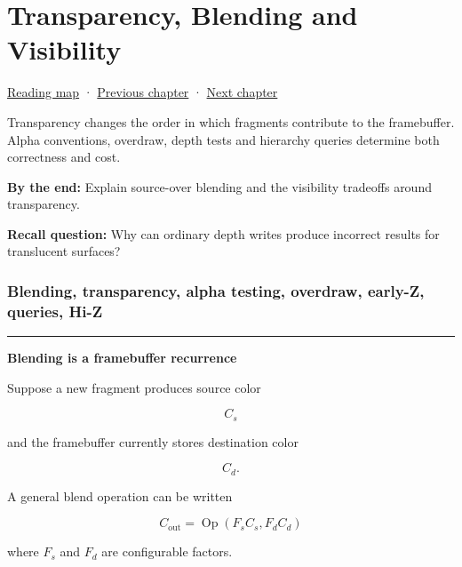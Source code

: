 \chapter{Transparency, Blending and Visibility}\label{03-visual-computing-i-ch014-transparency-blending-and-visibility}\hypertarget{03-visual-computing-i-ch014}{}\label{stagechapter:03-visual-computing-i-ch014}

\hypertarget{03-visual-computing-i-ch014-transparency-blending-and-visibility}{}

\hyperref[volume-reading-map]{Reading map} · \hyperref[03-visual-computing-i-ch010]{Previous chapter} · \hyperref[03-visual-computing-i-ch015-rasterization-foundations-and-renderer-evidence]{Next chapter}

Transparency changes the order in which fragments contribute to the framebuffer. Alpha conventions, overdraw, depth tests and hierarchy queries determine both correctness and cost.

\textbf{By the end:} Explain source-over blending and the visibility tradeoffs around transparency.

\textbf{Recall question:} Why can ordinary depth writes produce incorrect results for translucent surfaces?

\subsection{Blending, transparency, alpha testing, overdraw, early-Z, queries, Hi-Z}\label{03-visual-computing-i-ch014-blending-transparency-alpha-testing-overdraw-early-z-queries-hi-z}

\hypertarget{03-visual-computing-i-ch014-blending-transparency-alpha-testing-overdraw-early-z-queries-hi-z}{}

\begin{center}\rule{0.5\linewidth}{0.5pt}\end{center}

\textbf{Blending is a framebuffer recurrence}

Suppose a new fragment produces source color

\[
C_s
\]

and the framebuffer currently stores destination color

\[
C_d.
\]

A general blend operation can be written

\[
\boxed{
C_{\text{out}}
=
\operatorname{Op}
\left(
F_s C_s,
F_d C_d
\right)
}
\]

where \(F_s\) and \(F_d\) are configurable factors.

